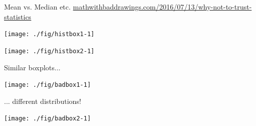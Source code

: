 \documentclass[xcolor=table,           xcolor=dvipsnames]{beamer}\usepackage[]{graphicx}\usepackage[]{color}
\newenvironment{knitrout}{}{} %
\newcounter{exercisecount}
\begin{document}



\begin{frame}[fragile]{Mean vs. Median etc.}
\href{https://mathwithbaddrawings.com/2016/07/13/why-not-to-trust-statistics/}{mathwithbaddrawings.com/2016/07/13/why-not-to-trust-statistics}
\begin{knitrout}
\color{fgcolor}

{\centering \texttt{[image: ./fig/histbox1-1]} 

}



\end{knitrout}
\pause
\begin{knitrout}
\color{fgcolor}

{\centering \texttt{[image: ./fig/histbox2-1]} 

}



\end{knitrout}
\end{frame}


\begin{frame}[fragile]{Similar boxplots...}
\begin{knitrout}
\color{fgcolor}

{\centering \texttt{[image: ./fig/badbox1-1]} 

}



\end{knitrout}
\end{frame}


\begin{frame}[fragile]{... different distributions!}
\begin{knitrout}
\color{fgcolor}

{\centering \texttt{[image: ./fig/badbox2-1]} 

}



\end{knitrout}
\end{frame}
\end{document}
